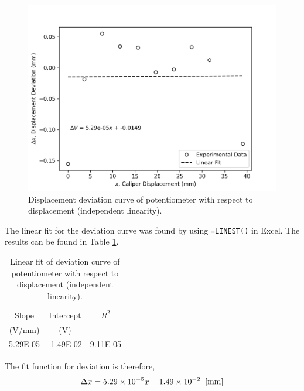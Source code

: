 \begin{figure}[h]
    \centering
    \includegraphics[width=0.8\linewidth]{matplotlib/Q1b.png}
    \caption{Displacement deviation curve of potentiometer with respect to displacement (independent linearity).}
    \label{fig:Q1b-deviation-curve}
\end{figure}

The linear fit for the deviation curve was found by using \texttt{=LINEST()} in Excel. The results can be found in Table \ref{tab:Q1b-deviation-curve-linear-fit}.

\begin{table}[h]
    \centering
    \caption{Linear fit of deviation curve of potentiometer with respect to displacement (independent linearity).}
    \label{tab:Q1b-deviation-curve-linear-fit}
    \begin{tabular}{ccc}
        \hline
        Slope & Intercept & $R^2$ \\
        (V/mm) & (V) & \\
        \midrule
        5.29E-05 & -1.49E-02 & 9.11E-05 \\
        \hline
    \end{tabular}
\end{table}

The fit function for deviation is therefore,
\[\Delta x = 5.29 \times 10^{-5}x - 1.49 \times 10^{-2} \;\;[\unit[]{mm}]\]

